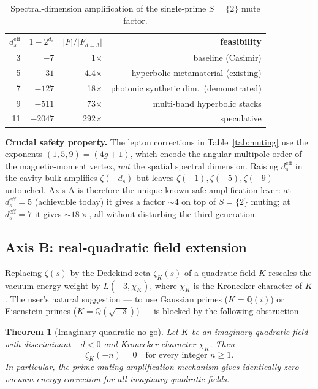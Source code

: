 \documentclass[11pt,a4paper]{article}
\newtheorem{theorem}{Theorem}
\begin{document}
\begin{table}[h]
\centering
\caption{Spectral-dimension amplification of the single-prime
$S=\{2\}$ mute factor.}
\label{tab:axis_A}
\begin{tabular}{@{}rrrr@{}}
\toprule
$d_s^{\mathrm{eff}}$ & $1-2^{d_s}$ & $|F|/|F_{d=3}|$ & feasibility \\
\midrule
3  & $-7$    & 1$\times$    & baseline (Casimir) \\
5  & $-31$   & 4.4$\times$  & hyperbolic metamaterial (existing) \\
7  & $-127$  & 18$\times$   & photonic synthetic dim.\ (demonstrated) \\
9  & $-511$  & 73$\times$   & multi-band hyperbolic stacks \\
11 & $-2047$ & 292$\times$  & speculative \\
\bottomrule
\end{tabular}
\end{table}

\textbf{Crucial safety property.} The lepton corrections in
Table~\ref{tab:muting} use the exponents $(1,5,9) = (4g+1)$, which
encode the angular multipole order of the magnetic-moment vertex,
\emph{not} the spatial spectral dimension. Raising
$d_s^{\mathrm{eff}}$ in the cavity bulk amplifies $\zeta(-d_s)$ but
leaves $\zeta(-1), \zeta(-5), \zeta(-9)$ untouched. Axis A is
therefore the unique known safe amplification lever: at
$d_s^{\mathrm{eff}}=5$ (achievable today) it gives a factor
$\sim 4$ on top of $S=\{2\}$ muting; at $d_s^{\mathrm{eff}}=7$ it
gives $\sim 18\times$, all without disturbing the third generation.

\subsection{Axis B: real-quadratic field extension}
\label{sec:axis_B}

Replacing $\zeta(s)$ by the Dedekind zeta $\zeta_K(s)$ of a
quadratic field $K$ rescales the vacuum-energy weight by
$L(-3, \chi_K)$, where $\chi_K$ is the Kronecker character of $K$.
The user's natural suggestion --- to use Gaussian primes
($K=\mathbb{Q}(i)$) or Eisenstein primes ($K=\mathbb{Q}(\sqrt{-3})$)
--- is blocked by the following obstruction.

\begin{theorem}[Imaginary-quadratic no-go]
\label{thm:imaginary_quad_nogo}
Let $K$ be an imaginary quadratic field with discriminant $-d<0$
and Kronecker character $\chi_K$. Then
\[
\zeta_K(-n) = 0 \quad\text{for every integer } n \geq 1.
\]
In particular, the prime-muting amplification mechanism gives
identically zero vacuum-energy correction for all imaginary
quadratic fields.
\end{theorem}
\end{document}
